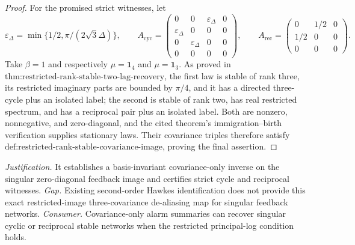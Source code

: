 \documentclass{article}
\begin{document}
\begin{proof}
For the promised strict witnesses, let
\[
 \varepsilon_\Delta=\min\{1/2,\pi/(2\sqrt3\Delta)\},\qquad
 A_{\mathrm{cyc}}=
 \begin{pmatrix}
 0&0&\varepsilon_\Delta&0\\
 \varepsilon_\Delta&0&0&0\\
 0&\varepsilon_\Delta&0&0\\
 0&0&0&0
 \end{pmatrix},\qquad
 A_{\mathrm{rec}}=
 \begin{pmatrix}
 0&1/2&0\\
 1/2&0&0\\
 0&0&0
 \end{pmatrix}.
\tag{7}
\]
Take \(\beta=1\) and respectively \(\mu=\mathbf 1_4\) and \(\mu=\mathbf 1_3\).  As proved in \(\text{thm:restricted-rank-stable-two-lag-recovery}\), the first law is stable of rank three, its restricted imaginary parts are bounded by \(\pi/4\), and it has a directed three-cycle plus an isolated label; the second is stable of rank two, has real restricted spectrum, and has a reciprocal pair plus an isolated label.  Both are nonzero, nonnegative, and zero-diagonal, and the cited theorem's immigration--birth verification supplies stationary laws.  Their covariance triples therefore satisfy \(\text{def:restricted-rank-stable-covariance-image}\), proving the final assertion.
\end{proof}
\par\smallskip\noindent \textit{Justification.} It establishes a basis-invariant covariance-only inverse on the singular zero-diagonal feedback image and certifies strict cycle and reciprocal witnesses. \textit{Gap.} Existing second-order Hawkes identification does not provide this exact restricted-image three-covariance de-aliasing map for singular feedback networks. \textit{Consumer.} Covariance-only alarm summaries can recover singular cyclic or reciprocal stable networks when the restricted principal-log condition holds.
\end{document}
